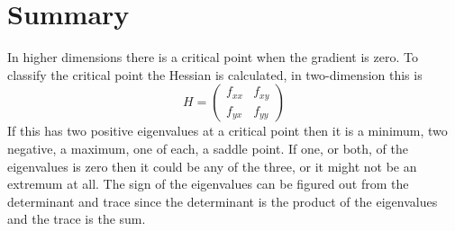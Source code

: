 \documentclass[12pt]{article}
\begin{document}
\section*{Summary}

In higher dimensions there is a critical point when the gradient is zero. To classify the critical point the Hessian is calculated, in two-dimension this is
  \begin{equation}
  H=\left(\begin{array}{cc}f_{xx}&f_{xy}\\f_{yx}&f_{yy}\end{array}\right)
\end{equation}
If this has two positive eigenvalues at a critical point then it is a
minimum, two negative, a maximum, one of each, a saddle point. If one,
or both, of the eigenvalues is zero then it could be any of the three,
or it might not be an extremum at all. The sign of the eigenvalues can
be figured out from the determinant and trace since the determinant is
the product of the eigenvalues and the trace is the sum.

  
\end{document}
